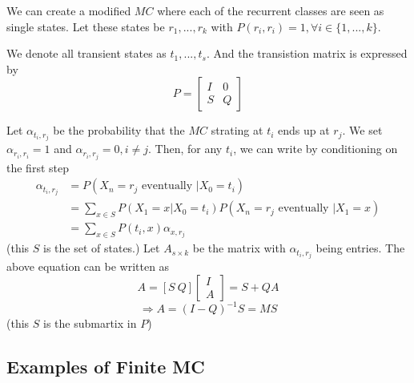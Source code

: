 \documentclass[11pt,a4paper]{article}
\begin{document}
We can create a modified $MC$ where each of the recurrent classes are seen as single states. Let these states be $r_1,...,r_k$ with $P (r_i, r_i) = 1,\forall i\in\{1,...,k\}$.

We denote all transient states as $t_1,...,t_s$. And the transistion matrix is expressed by $$P=\begin{bmatrix}
    I&0\\
    S&Q
\end{bmatrix}$$

Let $\alpha_{t_i,r_j}$ be the probability that the $MC$ strating at $t_i$ ends up at $r_j$. We set $\alpha_{r_i,r_i}=1$ and $\alpha_{r_i,r_j}=0,i\neq j$. Then, for any $t_i$, we can write by conditioning on the first step
\begin{equation}
    \begin{aligned}
        \alpha_{t_i,r_j}&=P(X_n=r_j\text{ eventually }|X_0=t_i)\\
        &=\sum_{x\in S}P(X_1=x|X_0=t_i)P(X_n=r_j\text{ eventually }|X_1=x)\\
        &=\sum_{x\in S}P(t_i,x)\alpha_{x,r_j}
    \end{aligned}
    \nonumber
\end{equation}
(this $S$ is the set of states.)
Let $A_{s\times k}$ be the matrix with $\alpha_{t_i,r_j}$ being entries. The above equation can be written as $$A=\left[S\ Q\right]\begin{bmatrix}
    I\\
    A
\end{bmatrix}=S+QA$$
$$\Rightarrow A=(I-Q)^{-1}S=MS$$
(this $S$ is the submartix in $P$)

\subsection{Examples of Finite MC}
\end{document}
